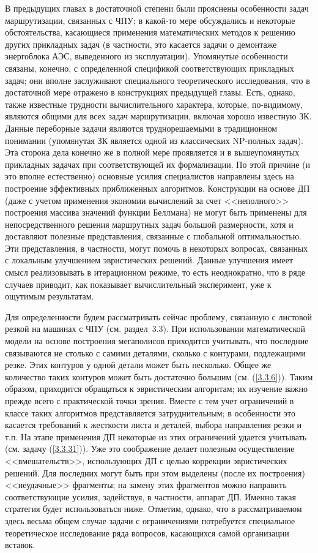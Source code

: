 \documentclass[11pt,twoside,openany]{report}
\begin{document}
{В предыдущих главах в достаточной степени были прояснены особенности задач
маршрутизации, связанных с ЧПУ; в какой-то мере обсуждались и некоторые
обстоятельства, касающиеся применения математических методов к решению других
прикладных задач (в частности, это касается задачи о демонтаже энергоблока
АЭС, выведенного из эксплуатации). Упомянутые особенности связаны, конечно,
с определенной спецификой соответствующих прикладных задач; они вполне
заслуживают специального теоретического исследования, что в достаточной
мере отражено в конструкциях предыдущей главы. Есть, однако, также
известные трудности вычислительного характера, которые, по-видимому,
являются общими для всех задач  маршрутизации, включая хорошо известную
ЗК. Данные переборные задачи являются труднорешаемыми в традиционном
понимании (упомянутая ЗК является одной из классических NP-полных задач).
Эта сторона дела конечно же в полной мере проявляется и в вышеупомянутых
прикладных задачах при соответствующей  их формализации. По этой причине
(и это вполне естественно) основные усилия специалистов направлены здесь
на построение эффективных приближенных алгоритмов. Конструкции на основе
ДП (даже с учетом применения экономии вычислений за счет <<неполного>>
построения массива значений функции Беллмана) не могут быть применены для
непосредственного решения маршрутных задач большой размерности, хотя и
доставляют полезные представления, связанные с глобальной оптимальностью.
Эти представления, в частности, могут помочь в некоторых вопросах,
связанных с локальным улучшением эвристических решений. Данные улучшения
имеет смысл реализовывать в итерационном режиме, то есть неоднократно,
что в ряде случаев приводит, как показывает вычислительный эксперимент,
уже к ощутимым результатам.

Для определенности будем рассматривать сейчас проблему, связанную с
листовой резкой на машинах с ЧПУ (см. раздел~3.3). При использовании
математической модели на основе построения мегаполисов приходится учитывать,
что последние связываются не столько с самими деталями, сколько с контурами,
подлежащими резке. Этих контуров у одной детали может быть несколько.
Общее же количество таких контуров может быть достаточно большим
(см. (\ref{3.3.6})). Таким образом, приходится обращаться к эвристическим
алгоритам; их изучение важно прежде всего с практической точки зрения.
Вместе с тем учет ограничений в классе таких алгоритмов представляется
затруднительным; в особенности это касается требований к жесткости листа
и деталей, выбора направления резки и т.п. На этапе применения ДП некоторые
из этих ограничений удается учитывать (см. задачу (\ref{3.3.31})).  Уже это
соображение делает полезным осуществление <<вмешательств>>, использующих ДП
с целью коррекции эвристических решений. Для последних могут быть при этом
выделены (после их построения) <<неудачные>> фрагменты; на замену этих
фрагментов можно направить соответствующие  усилия, задействуя, в частности,
аппарат ДП. Именно такая стратегия будет использоваться ниже. Отметим,
однако, что в рассматриваемом здесь весьма общем случае задачи с ограничениями
потребуется специальное теоретическое исследование ряда вопросов, касающихся
самой организации вставок.

}
\end{document}
